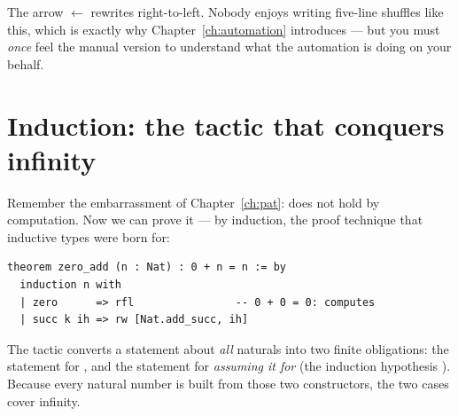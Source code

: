 The arrow \(\leftarrow\) rewrites right-to-left. Nobody enjoys writing five-line
shuffles like this, which is exactly why Chapter~\ref{ch:automation}
introduces  --- but you must \emph{once} feel the manual version to
understand what the automation is doing on your behalf.

\section{Induction: the tactic that conquers infinity}

Remember the embarrassment of Chapter~\ref{ch:pat}:  does not
hold by computation. Now we can prove it --- by induction, the proof
technique that inductive types were born for:

\begin{lstlisting}[language=Lean]
theorem zero_add (n : Nat) : 0 + n = n := by
  induction n with
  | zero      => rfl                -- 0 + 0 = 0: computes
  | succ k ih => rw [Nat.add_succ, ih]
\end{lstlisting}

The  tactic converts a statement about \emph{all} naturals
into two finite obligations: the statement for , and the statement
for  \emph{assuming it for}  (the induction hypothesis
). Because every natural number is built from those two
constructors, the two cases cover infinity.

